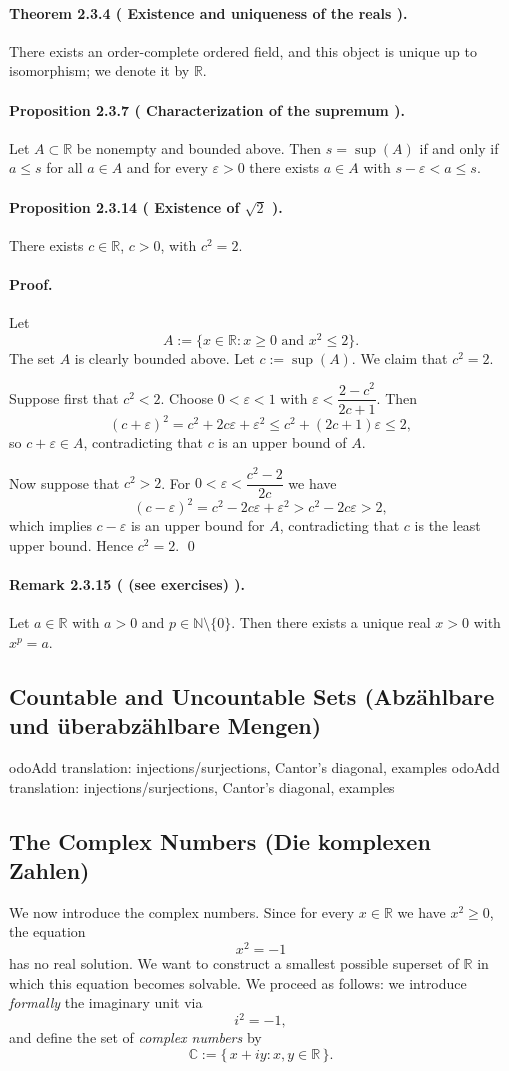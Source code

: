 \documentclass[12pt,a4paper]{article}
\newcommand{\N}{\mathbb{N}}
\newcommand{\R}{\mathbb{R}}
\newcommand{\C}{\mathbb{C}}
\newcommand{\eps}{\varepsilon}
\newcommand{\NumberedTheorem}[3]{%
	\paragraph{Theorem #1 ( #2 ).} #3\par
}
\newcommand{\NumberedRemark}[3]{%
  \paragraph{Remark #1 ( #2 ).} #3\par
}
\newcommand{\NumberedProposition}[3]{%
	\paragraph{Proposition #1 ( #2 ).} #3\par
}
\theoremstyle{plain}
\theoremstyle{definition}
\theoremstyle{remark}
\begin{document}
\NumberedTheorem{2.3.4}{Existence and uniqueness of the reals}{There exists an order-complete ordered field, and this object is unique up to isomorphism; we denote it by $\R$.}

\NumberedProposition{2.3.7}{Characterization of the supremum}{Let $A\subset \R$ be nonempty and bounded above. Then $s=\sup(A)$ if and only if $a\le s$ for all $a\in A$ and for every $\eps>0$ there exists $a\in A$ with $s-\eps < a \le s$.}

\NumberedProposition{2.3.14}{Existence of $\sqrt{2}$}{There exists $c\in\R$, $c>0$, with $c^2=2$.}

\paragraph{Proof.}
Let
\[
	A:=\{ x\in\R : x\ge 0 \text{ and } x^2\le 2\}.
\]
The set $A$ is clearly bounded above. Let $c:=\sup(A)$. We claim that $c^2=2$.

Suppose first that $c^2<2$. Choose $0<\eps<1$ with $\eps<\dfrac{2-c^2}{2c+1}$. Then
\[
	(c+\eps)^2 = c^2 + 2c\eps + \eps^2 \le c^2 + (2c+1)\eps \le 2,
\]
so $c+\eps\in A$, contradicting that $c$ is an upper bound of $A$.

Now suppose that $c^2>2$. For $0<\eps<\dfrac{c^2-2}{2c}$ we have
\[
	(c-\eps)^2 = c^2 - 2c\eps + \eps^2 > c^2 - 2c\eps > 2,
\]
which implies $c-\eps$ is an upper bound for $A$, contradicting that $c$ is the least upper bound. Hence $c^2=2$. \qed

\NumberedRemark{2.3.15}{(see exercises)}{Let $a\in\R$ with $a>0$ and $p\in\N\setminus\{0\}$. Then there exists a unique real $x>0$ with $x^p=a$.}

\subsection{Countable and Uncountable Sets (Abzählbare und überabzählbare Mengen)}
	odo{Add translation: injections/surjections, Cantor's diagonal, examples}
	odo{Add translation: injections/surjections, Cantor's diagonal, examples}

\subsection{The Complex Numbers (Die komplexen Zahlen)}\label{subsec:complex-numbers}

We now introduce the complex numbers. Since for every $x\in \R$ we have $x^2\ge 0$, the equation
\[
	x^2=-1
\]
has no real solution. We want to construct a smallest possible superset of $\R$ in which this equation becomes solvable. We proceed as follows: we introduce \emph{formally} the imaginary unit via
\[
	i^2=-1,
\]
and define the set of \emph{complex numbers} by
\[
	\C := \{\, x+iy : x,y\in \R \,\}.
\]
\end{document}

